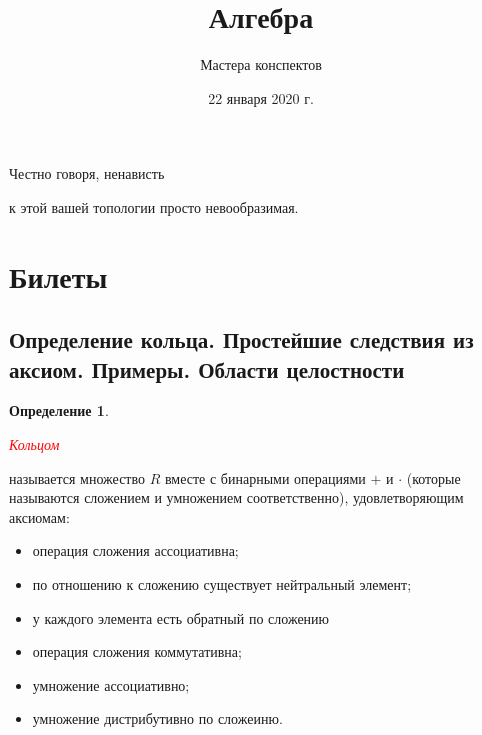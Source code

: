 \documentclass[a4paper,100pt]{article}
\title{Алгебра}
\author{Мастера конспектов}
\date{22 января 2020 г.}
\theoremstyle{indented}
\theoremstyle{definition}
\newtheorem{defn}{Определение}
\theoremstyle{remark}
\begin{document}
\newcommand{\resetexlcounters}{%
  \setcounter{exl}{0}%
} 

\newcommand{\resetremarkcounters}{%
  \setcounter{remark}{0}%
} 

\newcommand{\reseconscounters}{%
  \setcounter{cons}{0}%
} 

\newcommand{\resetall}{%
    \resetexlcounters
    \resetremarkcounters
    \reseconscounters%
}

\maketitle 

\newpage

\hypertarget{t1}{Честно говоря, ненависть} к этой вашей топологии просто невообразимая.
\tableofcontents

\newpage



\section{Билеты}



\subsection{Определение кольца. Простейшие следствия из аксиом. Примеры. Области целостности}

\medskip

\begin{defn}
    \hypertarget{n1}{\textcolor{red}{\textit{Кольцом}}} называется множество $R$ вместе с бинарными операциями $+$ и $\cdot$ (которые называются сложением и умножением соответственно), удовлетворяющим аксиомам:\

    \begin{itemize}
        \item операция сложения ассоциативна;
        \item по отношению к сложению существует нейтральный элемент;
        \item у каждого элемента есть обратный по сложению
        \item операция сложения коммутативна;
        \item умножение ассоциативно;
        \item умножение дистрибутивно по сложеиню.
    \end{itemize}
\end{defn}
\end{document}
